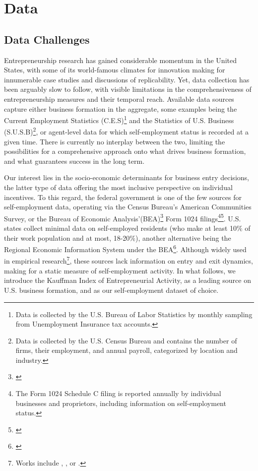 \chapter{Data\label{ch:data}}

\section{Data Challenges}

Entrepreneurship research has gained considerable momentum in the United States, with some of its world-famous climates for innovation making for innumerable case studies and discussions of replicability. Yet, data collection has been arguably slow to follow, with visible limitations in the comprehensiveness of entrepreneurship measures and their temporal reach. Available data sources capture either business formation in the aggregate, some examples being the Current Employment Statistics (C.E.S)\footnote{Data is collected by the U.S. Bureau of Labor Statistics by monthly sampling from Unemployment Insurance tax accounts.} and the Statistics of U.S. Business (S.U.S.B)\footnote{Data is collected by the U.S. Census Bureau and contains the number of firms, their employment, and annual payroll, categorized by location and industry.}, or agent-level data for which self-employment status is recorded at a given time. There is currently no interplay between the two, limiting the possibilities for a comprehensive approach onto what drives business formation, and what guarantees success in the long term. 

Our interest lies in the socio-economic determinants for business entry decisions, the latter type of data offering the most inclusive perspective on individual incentives. To this regard, the federal government is one of the few sources for self-employment data, operating via the Census Bureau’s American Communities Survey, or the Bureau of Economic Analysis'(BEA)\footnote{\cite{BEA}} Form 1024 filings\footnote{The Form 1024 Schedule C filing is reported annually by individual businesses and proprietors, including information on self-employment status. }\footnote{\cite{Goetz2008}}. U.S. states collect minimal data on self-employed residents (who make at least 10\% of their work population and at most, 18-20\%), another alternative being the Regional Economic Information System under the BEA\footnote{\cite{Goetz2008}}. Although widely used in empirical research\footnote{Works include \cite{Glaeser2007}, \cite{AcsArmington2006}, or \cite{ShresthaGoetzRupasingha2007}. }, these sources lack information on entry and exit dynamics, making for a  static measure of self-employment activity. In what follows, we introduce the Kauffman Index of Entrepreneurial Activity, as a leading source on U.S. business formation, and as our self-employment dataset of choice. 

